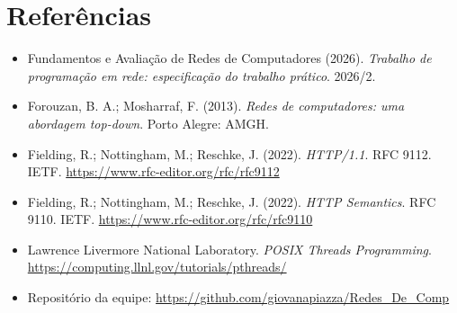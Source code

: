 \documentclass[11pt,a4paper]{article}
\begin{document}
\section*{Referências}
\begin{itemize}
  \item Fundamentos e Avaliação de Redes de Computadores (2026). \emph{Trabalho de
  programação em rede: especificação do trabalho prático}. 2026/2.
  \item Forouzan, B. A.; Mosharraf, F. (2013). \emph{Redes de computadores: uma abordagem
  top-down}. Porto Alegre: AMGH.
  \item Fielding, R.; Nottingham, M.; Reschke, J. (2022). \emph{HTTP/1.1}. RFC 9112. IETF.
  \url{https://www.rfc-editor.org/rfc/rfc9112}
  \item Fielding, R.; Nottingham, M.; Reschke, J. (2022). \emph{HTTP Semantics}. RFC 9110. IETF.
  \url{https://www.rfc-editor.org/rfc/rfc9110}
  \item Lawrence Livermore National Laboratory. \emph{POSIX Threads Programming}.
  \url{https://computing.llnl.gov/tutorials/pthreads/}
  \item Repositório da equipe: \url{https://github.com/giovanapiazza/Redes_De_Comp}
\end{itemize}
\end{document}
